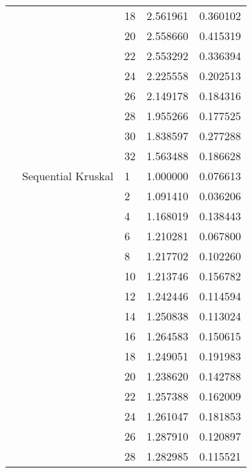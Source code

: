 \begin{tabular}{lllrr}
                       &                    & 18 &  2.561961 &  0.360102 \\
                       &                    & 20 &  2.558660 &  0.415319 \\
                       &                    & 22 &  2.553292 &  0.336394 \\
                       &                    & 24 &  2.225558 &  0.202513 \\
                       &                    & 26 &  2.149178 &  0.184316 \\
                       &                    & 28 &  1.955266 &  0.177525 \\
                       &                    & 30 &  1.838597 &  0.277288 \\
                       &                    & 32 &  1.563488 &  0.186628 \\
                       & Sequential Kruskal & 1  &  1.000000 &  0.076613 \\
                       &                    & 2  &  1.091410 &  0.036206 \\
                       &                    & 4  &  1.168019 &  0.138443 \\
                       &                    & 6  &  1.210281 &  0.067800 \\
                       &                    & 8  &  1.217702 &  0.102260 \\
                       &                    & 10 &  1.213746 &  0.156782 \\
                       &                    & 12 &  1.242446 &  0.114594 \\
                       &                    & 14 &  1.250838 &  0.113024 \\
                       &                    & 16 &  1.264583 &  0.150615 \\
                       &                    & 18 &  1.249051 &  0.191983 \\
                       &                    & 20 &  1.238620 &  0.142788 \\
                       &                    & 22 &  1.257388 &  0.162009 \\
                       &                    & 24 &  1.261047 &  0.181853 \\
                       &                    & 26 &  1.287910 &  0.120897 \\
                       &                    & 28 &  1.282985 &  0.115521 \\

\end{tabular}
